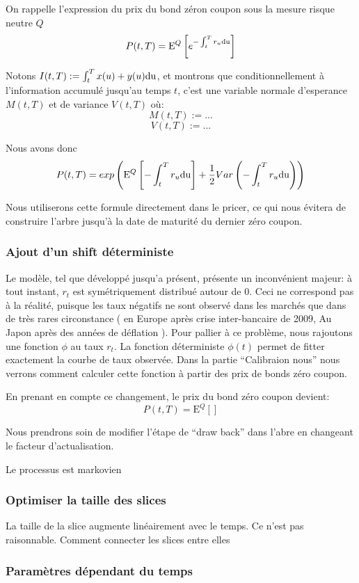 \documentclass[paper=a4, fontsize=11pt]{scrartcl}
\numberwithin{equation}{section}		%
\numberwithin{figure}{section}			%
\numberwithin{table}{section}				%
\newcommand{\espr}[1]{
  \mathrm{E}^Q \left[ #1 \right]
}
\theoremstyle{definition}
\begin{document}
On rappelle l'expression du prix du bond zéron coupon sous la mesure risque neutre $Q$
$$P(t, T) = \espr{ e^{-\int_t^T r_u \rm{d}u}} $$

Notons $I(t, T) := \int_t^T x(u) + y(u) \rm{d}u$, et montrons que conditionnellement à l'information accumulé jusqu'au temps $t$, c'est une variable normale d'esperance $M(t, T)$ et de variance $V(t, T)$ où:
$$M(t, T) := ...$$
$$V(t, T) := ...$$

Nous avons donc
$$P(t, T) = exp  \left( \espr{ -\int_t^T r_u \rm{d}u} + \frac{1}{2} Var \left( {-\int_t^T r_u \rm{d}u} \right)  \right) $$

Nous utiliserons cette formule directement dans le pricer, ce qui nous évitera de construire l'arbre jusqu'à la date de maturité du dernier zéro coupon.

\subsubsection{Ajout d'un shift déterministe}
Le modèle, tel que développé jusqu'a présent, présente un inconvénient majeur: à tout instant, $r_t$ est symétriquement distribué autour de $0$. Ceci ne correspond pas à la réalité, puisque les taux négatifs ne sont observé dans les marchés que dans de très rares circonstance ( en Europe après crise inter-bancaire de 2009, Au Japon après des années de déflation ). Pour pallier à ce problème, nous rajoutons une fonction $\phi$ au taux $r_t$. La fonction déterministe $\phi(t)$ permet de fitter exactement la courbe de taux observée. Dans la partie ``Calibraion nous'' nous verrons comment calculer cette fonction à partir des prix de bonds zéro coupon.

En prenant en compte ce changement, le prix du bond zéro coupon devient:
$$P(t, T) = \espr{}$$

Nous prendrons soin de modifier l'étape de ``draw back'' dans l'abre en changeant le facteur d'actualisation.

Le processus est markovien

\subsubsection{Optimiser la taille des slices }
La taille de la slice augmente linéairement avec le temps. Ce n'est pas raisonnable.
Comment connecter les slices entre elles


\subsubsection{ Paramètres dépendant du temps}
\end{document}

